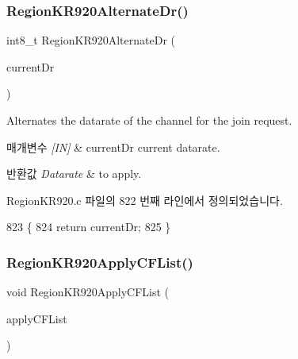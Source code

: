 \subsubsection{\texorpdfstring{Region\+K\+R920\+Alternate\+Dr()}{RegionKR920AlternateDr()}}
{\footnotesize\ttfamily int8\+\_\+t Region\+K\+R920\+Alternate\+Dr (\begin{DoxyParamCaption}\item[{int8\+\_\+t}]{current\+Dr }\end{DoxyParamCaption})}



Alternates the datarate of the channel for the join request. 


\begin{DoxyParams}{매개변수}
{\em \mbox{[}\+I\+N\mbox{]}} & current\+Dr current datarate.\\
\hline
\end{DoxyParams}

\begin{DoxyRetVals}{반환값}
{\em Datarate} & to apply. \\
\hline
\end{DoxyRetVals}


Region\+K\+R920.\+c 파일의 822 번째 라인에서 정의되었습니다.


\begin{DoxyCode}
823 \{
824     \textcolor{keywordflow}{return} currentDr;
825 \}
\end{DoxyCode}
\mbox{\label{group___r_e_g_i_o_n_k_r920_ga7b758b39bc0f003f90deaa751a596b02}} 
\subsubsection{\texorpdfstring{Region\+K\+R920\+Apply\+C\+F\+List()}{RegionKR920ApplyCFList()}}
{\footnotesize\ttfamily void Region\+K\+R920\+Apply\+C\+F\+List (\begin{DoxyParamCaption}\item[{\mbox{\hyperlink{group___r_e_g_i_o_n_ga71588e9ad07e34b78fa91d51881fd3c6}{Apply\+C\+F\+List\+Params\+\_\+t}} $\ast$}]{apply\+C\+F\+List }\end{DoxyParamCaption})}



